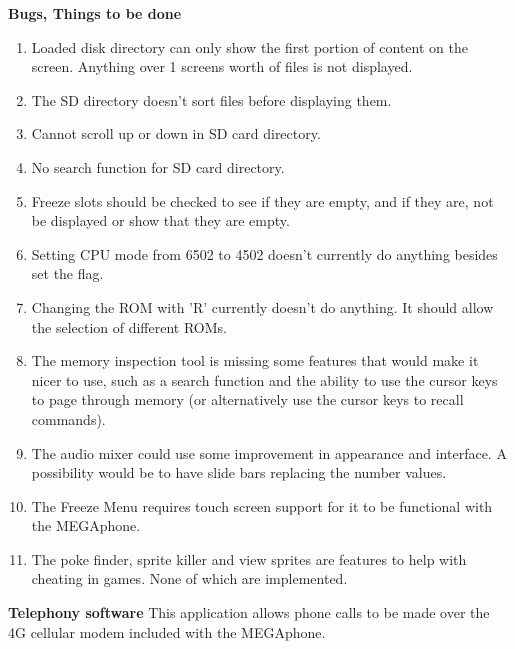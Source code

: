 \textbf{Bugs, Things to be done}
\begin{enumerate}
\item Loaded disk directory can only show the first portion of content on the screen. Anything over 1 screens worth of files is not displayed.
\item The SD directory doesn't sort files before displaying them.
\item Cannot scroll up or down in SD card directory.
\item No search function for SD card directory.
\item Freeze slots should be checked to see if they are empty, and if they are, not be displayed or show that they are empty.
\item Setting CPU mode from 6502 to 4502 doesn't currently do anything besides set the flag.
\item Changing the ROM with 'R' currently doesn't do anything. It should allow the selection of different ROMs.
\item The memory inspection tool is missing some features that would make it nicer to use, such as a search function and the ability to use the cursor keys to page through memory (or alternatively use the cursor keys to recall commands).
\item The audio mixer could use some improvement in appearance and interface. A possibility would be to have slide bars replacing the number values.
\item The Freeze Menu requires touch screen support for it to be functional with the MEGAphone.
\item The poke finder, sprite killer and view sprites are features to help with cheating in games. None of which are implemented.
\end{enumerate}


\textbf{Telephony software}
This application allows phone calls to be made over the 4G cellular modem included with the MEGAphone. 

